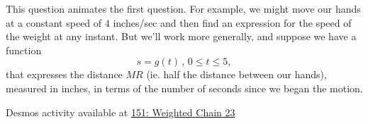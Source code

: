 \documentclass{ximera}
\begin{document}
\begin{question}  \label{Q:DFDFGGtg}
This question animates the first question. For example, we might move our hands at a constant speed of $4$ inches/sec and then find an expression for the speed of the weight at any instant. But we'll work more generally, and suppose we have a function
\[
   s = g(t) \, , \, 0\leq t \leq 5,
\]
that expresses the distance $MR$ (ie. half the distance between our hands), measured in inches, in terms of the number of seconds since we began the motion.

\begin{onlineOnly}
    \begin{center}
\end{center}
\end{onlineOnly}

Desmos activity available at \href{https://www.desmos.com/calculator/x0e7h7sobg}{151: Weighted Chain 23}

\end{question}
\end{document}
